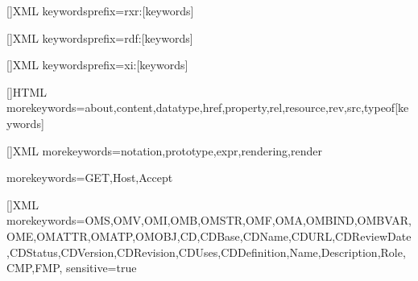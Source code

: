[]{XML}%
{keywordsprefix={rxr:}}[keywords]

[]{XML}%
{keywordsprefix={rdf:}}[keywords]

[]{XML}%
{keywordsprefix={xi:}}[keywords]

[]{HTML}%
{morekeywords={about,content,datatype,href,property,rel,resource,rev,src,typeof}}[keywords]

[]{XML}%
{morekeywords={notation,prototype,expr,rendering,render}}

%
{morekeywords={GET,Host,Accept}}

[]{XML}%
  {morekeywords={OMS,OMV,OMI,OMB,OMSTR,OMF,OMA,OMBIND,OMBVAR,OME,OMATTR,OMATP,OMOBJ,CD,CDBase,CDName,CDURL,CDReviewDate,CDStatus,CDVersion,CDRevision,CDUses,CDDefinition,Name,Description,Role,CMP,FMP},
  sensitive=true}

